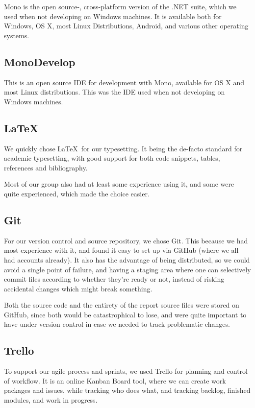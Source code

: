 \documentclass[12pt, a4paper]{article}
\begin{document}
Mono is the open source-, cross-platform version of the .NET suite, which we used when not developing on Windows machines. It is available both for Windows, OS X, most Linux Distributions, Android, and various other operating systems.

\subsection{MonoDevelop}
This is an open source IDE for development with Mono, available for OS X and most Linux distributions. This was the IDE used when not developing on Windows machines.

\subsection{LaTeX}
We quickly chose \LaTeX \ for our typesetting. It being the de-facto standard for academic typesetting, with good support for both code snippets, tables, references and bibliography.

Most of our group also had at least some experience using it, and some were quite experienced, which made the choice easier.

\subsection{Git}
For our version control and source repository, we chose Git. This because we had most experience with it, and found it easy to set up via GitHub (where we all had accounts already). It also has the advantage of being distributed, so we could avoid a single point of failure, and having a staging area where one can selectively commit files according to whether they're ready or not, instead of risking accidental changes which might break something.

Both the source code and the entirety of the report source files were stored on GitHub, since both would be catastrophical to lose, and were quite important to have under version control in case we needed to track problematic changes.

\subsection{Trello}
To support our agile process and sprints, we used Trello for planning and control of workflow. It is an online Kanban Board tool, where we can create work packages and issues, while tracking who does what, and tracking backlog, finished modules, and work in progress.
\end{document}
